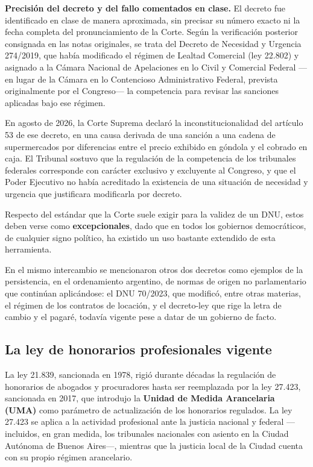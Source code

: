 \documentclass[12pt,oneside]{book}
\begin{document}
\begin{note}
\textbf{Precisión del decreto y del fallo comentados en clase.} El decreto fue identificado en clase de manera aproximada, sin precisar su número exacto ni la fecha completa del pronunciamiento de la Corte. Según la verificación posterior consignada en las notas originales, se trata del Decreto de Necesidad y Urgencia 274/2019, que había modificado el régimen de Lealtad Comercial (ley 22.802) y asignado a la Cámara Nacional de Apelaciones en lo Civil y Comercial Federal ---en lugar de la Cámara en lo Contencioso Administrativo Federal, prevista originalmente por el Congreso--- la competencia para revisar las sanciones aplicadas bajo ese régimen.

En agosto de 2026, la Corte Suprema declaró la inconstitucionalidad del artículo 53 de ese decreto, en una causa derivada de una sanción a una cadena de supermercados por diferencias entre el precio exhibido en góndola y el cobrado en caja. El Tribunal sostuvo que la regulación de la competencia de los tribunales federales corresponde con carácter exclusivo y excluyente al Congreso, y que el Poder Ejecutivo no había acreditado la existencia de una situación de necesidad y urgencia que justificara modificarla por decreto.
\end{note}

Respecto del estándar que la Corte suele exigir para la validez de un DNU, estos deben verse como \textbf{excepcionales}, dado que en todos los gobiernos democráticos, de cualquier signo político, ha existido un uso bastante extendido de esta herramienta.

En el mismo intercambio se mencionaron otros dos decretos como ejemplos de la persistencia, en el ordenamiento argentino, de normas de origen no parlamentario que continúan aplicándose: el DNU 70/2023, que modificó, entre otras materias, el régimen de los contratos de locación, y el decreto-ley que rige la letra de cambio y el pagaré, todavía vigente pese a datar de un gobierno de facto.

\subsection{La ley de honorarios profesionales vigente}

La ley 21.839, sancionada en 1978, rigió durante décadas la regulación de honorarios de abogados y procuradores hasta ser reemplazada por la ley 27.423, sancionada en 2017, que introdujo la \textbf{Unidad de Medida Arancelaria (UMA)} como parámetro de actualización de los honorarios regulados. La ley 27.423 se aplica a la actividad profesional ante la justicia nacional y federal ---incluidos, en gran medida, los tribunales nacionales con asiento en la Ciudad Autónoma de Buenos Aires---, mientras que la justicia local de la Ciudad cuenta con su propio régimen arancelario.
\end{document}
